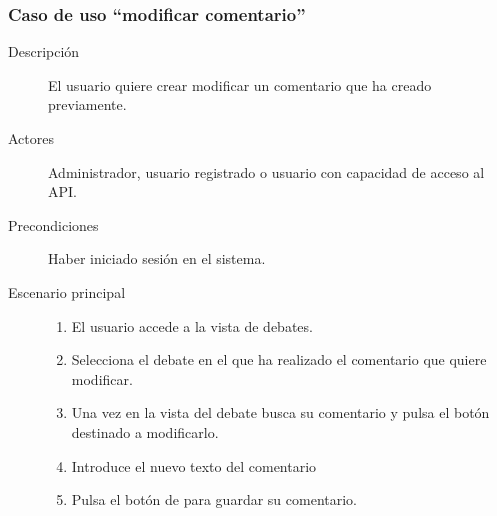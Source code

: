 \subsubsection{Caso de uso ``modificar comentario''}
\begin{description}
\item[Descripción] El usuario quiere crear modificar un comentario que ha creado previamente.
\item[Actores] Administrador, usuario registrado o usuario con capacidad de acceso al API.
\item[Precondiciones] Haber iniciado sesión en el sistema.
\item[Escenario principal] \hfill
						 	\begin{enumerate}
							\item El usuario accede a la vista de debates.
							\item Selecciona el debate en el que ha realizado el comentario que quiere modificar.
							\item Una vez en la vista del debate busca su comentario y pulsa el botón destinado a modificarlo.
							\item Introduce el nuevo texto del comentario
							\item Pulsa el botón de para guardar su comentario.
							\end{enumerate}
\end{description}


